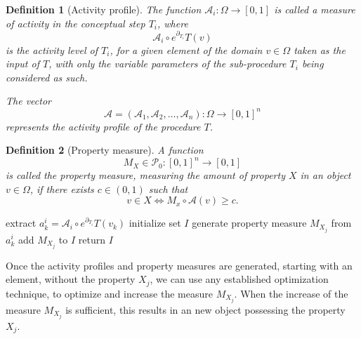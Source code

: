 \documentclass[smallcondensed]{svjour3}
\newcommand{\dP}{\mathcal{P}}
\newcommand{\D}{\partial}
\newtheorem{definicija}{Definition}[section]
\begin{document}
   
   \begin{definicija}[Activity profile]
   The function $\mathcal{A}_i:\Omega\to[0,1]$ is called a \emph{measure of activity} in the conceptual step $T_i$, where 
   $$\mathcal{A}_i\circ e^{\D_{T_i}}T(v)$$ 
   is the \emph{activity level} of $T_i$, for a given element of the domain $v\in \Omega$ taken as the input of $T$, with only the variable parameters of the sub-procedure $T_i$ being considered as such.
   
   The vector $$\mathcal{A}=(\mathcal{A}_1,\mathcal{A}_2,\dots,\mathcal{A}_n):\Omega\to[0,1]^n$$ represents the activity profile of the procedure $T$. 
   \end{definicija}
   
   
   \begin{definicija}[Property measure]
    A function 
    $$M_X\in\dP_0:[0,1]^n\to[0,1]$$  
    is called the property measure, measuring the amount of property $X$ in an object $v\in\Omega$, if there exists  $c\in(0,1)$ such that 
    $$v\in X\iff M_x\circ\mathcal{A}(v)\ge c.$$
    \end{definicija}
   \vspace{-1cm}
   \begin{algorithm}[H]
   
   \caption{Construct property measure}
   \label{alg:propertyMeasure}
   \begin{algorithmic}[1]
   \State extract $a^i_k=\mathcal{A}_i\circ e^{\D_{T_i}}T(v_k)$
	\EndFor
	\EndFor
	\State initialize set $I$
   \State generate property measure $M_{X_j}$ from $a^i_k$
   \State add $M_{X_j}$ to $I$
   \EndFor
   \State return $I$
   \EndProcedure
   \end{algorithmic}
   \end{algorithm}
   
   Once the activity profiles and property measures are generated, starting with an element, without the property $X_j$, we can use any established optimization technique, to optimize and increase the measure $M_{X_j}$. When the increase of the measure $M_{X_j}$ is sufficient, this results in an new object possessing the property $X_j$.
   
\end{document}
